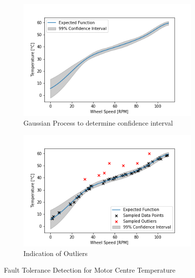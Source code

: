\documentclass[a4paper, 10pt]{article}
\numberwithin{equation}{section}
\begin{document}
\begin{figure}[H]
    \centering
    \begin{subfigure}[b]{0.49\textwidth}
        \centering
        \includegraphics[width=\textwidth]{images/fault_tolerance_PL_1_1sensor.png}
        
        \caption{Gaussian Process to determine confidence interval}
        \label{fig:gp_fault_detection_1sensor}
    \end{subfigure}
    \hfill
    \begin{subfigure}[b]{0.49\textwidth}
        \centering
        \includegraphics[width=\textwidth]{images/fault_tolerance_PL_1_outliers_1sensor.png}
        
        \caption{Indication of Outliers}
        \label{fig:gp_fault_detection_outliers_1sensor}
    \end{subfigure}
    \vspace{-10pt}
    \caption{Fault Tolerance Detection for Motor Centre Temperature}
\vspace{-0.4cm}
\end{figure}
\end{document}
